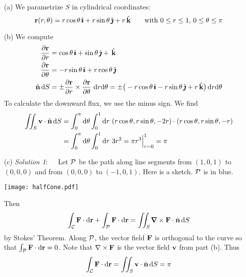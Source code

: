 \begin{solution}  (a)
We parametrize $S$ in cylindrical coordinates:
\begin{equation*}
\mathbf{r}(r, \theta) = r\cos \theta\, \hat{\pmb{\imath}} +r\sin \theta\, \hat{\pmb{\jmath}} + r\,\hat{\mathbf{k}}
             \qquad \text{with $0\le r\le 1$, $0\le \theta \le \pi$}
\end{equation*}


(b) 
We compute
\begin{align*}
\frac{\partial \mathbf{r}}{\partial r}
    &= \cos \theta \,\hat{\pmb{\imath}} +\sin \theta \,\hat{\pmb{\jmath}} +\,\hat{\mathbf{k}} \\
\frac{\partial \mathbf{r}}{\partial \theta} 
    &= -r \sin \theta \,\hat{\pmb{\imath}} + r\cos \theta \,\hat{\pmb{\jmath}} \\
\hat{\mathbf{n}}\, \mathrm{d}S &= \pm \frac{\partial \mathbf{r}}{\partial r}\times 
                     \frac{\partial \mathbf{r}}{\partial \theta} 
                   \ \mathrm{d}r  \mathrm{d}\theta
         = \pm \big(-r\cos \theta \,\hat{\pmb{\imath}} - r \sin \theta \,\hat{\pmb{\jmath}} + r \,\hat{\mathbf{k}}\big)\,
                   \mathrm{d}r \mathrm{d}\theta
\end{align*}
To calculate the downward flux, we use the minus sign. We find
\begin{align*}
\iint_S \mathbf{v} \cdot \hat{\mathbf{n}}\, \mathrm{d}S 
& = \int_0^\pi \mathrm{d}\theta \int_0^1 \mathrm{d}r\  (r \cos \theta, r\sin \theta, -2r)\cdot 
                   (r\cos \theta, r\sin \theta, -r) \\
&= \int_0^\pi \mathrm{d}\theta \int_0^1 \mathrm{d}r\  3 r^2 
  = \pi r^3\Big|_{r=0}^1 = \pi
\end{align*}

(c) \emph{Solution 1}:\ \ \ 
Let $\mathcal{P}$ be the path along line segments from $(1,0,1)$ to $(0,0,0)$ 
and from $(0,0,0)$ to $(-1,0,1)$. Here is a sketch. $\mathcal{P}$ is
in blue.

\begin{center}
     \texttt{[image: halfCone.pdf]}
\end{center}


Then
\begin{equation*}
\int_\cC \vF \cdot \dee{\vr} + \int_\cP \vF \cdot \dee{\vr} 
= \dblInt_S \vnabla \times \vF \cdot \hn\, \dee{S}
\end{equation*}
by Stokes' Theorem. Along $\mathcal{P}$, the vector field $\mathbf{F}$ is orthogonal 
to the curve so that $\int_{\mathcal{P}} \mathbf{F}\cdot \mathrm{d}\mathbf{r}=0$. Note that 
$\nabla\times \mathbf{F}$ is the vector field $\mathbf{v}$ from part (b). 
Thus
\begin{equation*}
\int_{\mathcal{C}} \mathbf{F}\cdot \mathrm{d}\mathbf{r} = \iint_S \mathbf{v} \cdot \hat{\mathbf{n}}\, \mathrm{d}S = \pi
\end{equation*}


\end{solution}
